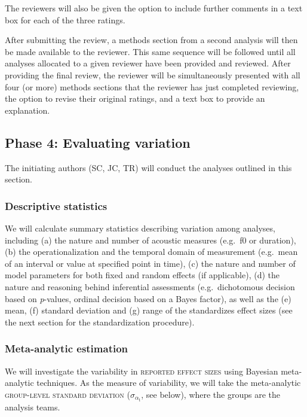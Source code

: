 \documentclass[Review,times,sageh]{sagej}
\begin{document}
The reviewers will also be given the option to include further comments in a text box for each of the three ratings.

After submitting the review, a methods section from a second analysis will then be made available to the reviewer.
This same sequence will be followed until all analyses allocated to a given reviewer have been provided and reviewed.
After providing the final review, the reviewer will be simultaneously presented with all four (or more) methods sections that the reviewer has just completed reviewing, the option to revise their original ratings, and a text box to provide an explanation.

\hypertarget{phase-4-evaluating-variation}{%
\subsection{Phase 4: Evaluating variation}\label{phase-4-evaluating-variation}}

The initiating authors (SC, JC, TR) will conduct the analyses outlined in this section.

\hypertarget{descriptive-statistics}{%
\subsubsection{Descriptive statistics}\label{descriptive-statistics}}

We will calculate summary statistics describing variation among analyses, including (a) the nature and number of acoustic measures (e.g.~f0 or duration), (b) the operationalization and the temporal domain of measurement (e.g.~mean of an interval or value at specified point in time), (c) the nature and number of model parameters for both fixed and random effects (if applicable), (d) the nature and reasoning behind inferential assessments (e.g.~dichotomous decision based on \emph{p}-values, ordinal decision based on a Bayes factor), as well as the (e) mean, (f) standard deviation and (g) range of the standardizes effect sizes (see the next section for the standardization procedure).

\hypertarget{s:meta-est}{%
\subsubsection{Meta-analytic estimation}\label{s:meta-est}}

We will investigate the variability in \textsc{reported effect sizes} using Bayesian meta-analytic techniques.
As the measure of variability, we will take the meta-analytic \textsc{group-level standard deviation} (\(\sigma_{\alpha_{\text{t}}}\), see below), where the groups are the analysis teams.
\end{document}
